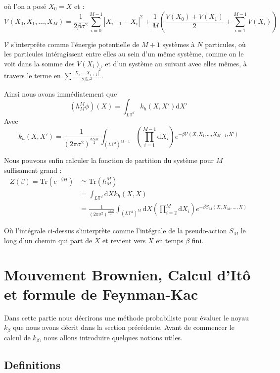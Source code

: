 \documentclass[11pt]{article}
\theoremstyle{definition}
\theoremstyle{remark}
\newcommand{\dom}{L\mathbb{T}^d}
\begin{document}
où l'on a posé $X_0=X$ et :
\begin{equation}
\mathcal{V}\left(X_0,X_1,\ldots,X_M\right)= \frac{1}{2\beta\sigma^2}\sum_{i=0}^{M-1}|X_{i+1}-X_i|^2+\frac{1}{M}\left(\frac{V(X_0)+V(X_1)}{2}+\sum_{i=1}^{M-1} V(X_i)\right)
\end{equation}

$\mathcal{V}$ s'interprête comme l'énergie potentielle de $M+1$ systèmes à $N$ particules, où les particules intéragissent entre elles au sein d'un même système, comme on le voit dans la somme des $V(X_i)$, et d'un système au suivant avec elles mêmes, à travers le terme en $\sum \frac{|X_{i}-X_{i+1}|^2}{2\beta\sigma^2}$.

Ainsi nous avons immédiatement que 
\begin{equation}
(h_M^M\phi)(X)=\int_{\dom}k_h(X,X')\mathrm{d}X'
\end{equation}
Avec 
\begin{equation}
k_h(X,X')=\frac{1}{(2\pi\sigma^2)^\frac{dNM}{2}}\int_{(\dom)^{M-1}} \left(\prod_{i=1}^{M-1}\mathrm{d}X_i\right) e^{-\beta \mathcal{V}(X,X_1,\ldots,X_{M-1},X')}
\end{equation}

Nous pouvons enfin calculer la fonction de partition du système pour $M$ suffisament grand :
\begin{align*}
Z(\beta)=\mathrm{Tr}(e^{-\beta H})& \simeq \mathrm{Tr}(h_M^M)
\\
&= \int_{\dom}\mathrm{d}X k_h(X,X)
\\
&= \frac{1}{(2\pi\sigma^2)^\frac{dNM}{2}}\int_{(\dom)^{M}} \mathrm{d}X\left(\prod_{i=2}^{M}\mathrm{d}X_i\right) e^{-\beta S_M(X,X_M,\ldots,X)}
\end{align*}

Où l'intégrale ci-dessus s'interprète comme l'intégrale de la pseudo-action $S_M$ le long d'un chemin qui part de $X$ et revient vers $X$ en temps $\beta$ fini.

\section{Mouvement Brownien, Calcul d'Itô et formule de Feynman-Kac}\label{sec:brown}
Dans cette partie nous décrirons une méthode probabiliste pour évaluer le noyau $k_{\beta}$ que nous avons décrit dans la section précédente. 
Avant de commencer le calcul de $k_{\beta}$, nous allons introduire quelques notions utiles.

\subsection{Definitions}
\end{document}
